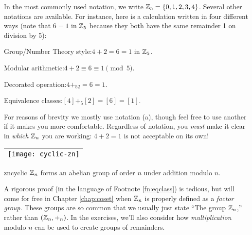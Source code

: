 \begin{example}{}{}
	In the most commonly used notation, we write $\mathbb{Z}_5=\{0,1,2,3,4\}$. Several other notations are available. For instance, here is a calculation written in four different ways (note that $6=1$ in $\mathbb{Z}_5$ because they both have the same remainder 1 on division by 5):\par
	\begin{minipage}[t]{0.62\linewidth}\vspace{0pt}
		\begin{enumeratea}
		  \item Group/Number Theory style:\quad $4+2=6=1$ in $\mathbb{Z}_5$.
		  \item Modular arithmetic:\quad $4+2\equiv 6\equiv 1\pmod 5$.
		  \item Decorated operation:\quad $4+_52=6=1$.
		  \item Equivalence classes:\quad $[4]+_5[2]=[6]=[1]$.
		\end{enumeratea}
		For reasons of brevity we mostly use notation (a), though feel free to use another if it makes you more comfortable. Regardless of notation, you \emph{must} make it clear in \emph{which} $\mathbb{Z}_n$ you are working: $4+2=1$ is not acceptable on its own!
	\end{minipage}
	\hfill
	\begin{minipage}[t]{0.37\linewidth}\vspace{-20pt}
			\flushright%
			\begin{tabular}{@{}c@{}}
			\texttt{[image: cyclic-zn]}%
		\end{tabular}
	\end{minipage}%
\end{example}


\begin{thm}{}{zncyclic}
	$\mathbb{Z}_n$ forms an abelian group of order $n$ under addition modulo $n$.
\end{thm}

A rigorous proof (in the language of Footnote \ref{fn:eqclass}) is tedious, but will come for free in Chapter \ref{chap:coset} when $\mathbb{Z}_n$ is properly defined as a \emph{factor group.} These groups are so common that we usually just state ``The group $\mathbb{Z}_n$,'' rather than $(\mathbb{Z}_n,+_n)$. 
In the exercises, we'll also consider how \emph{multiplication} modulo $n$ can be used to create groups of remainders.

\goodbreak



